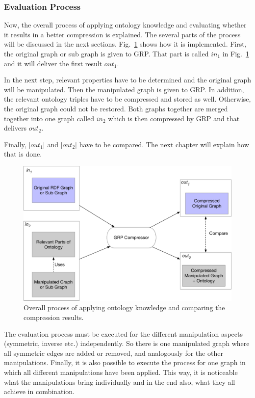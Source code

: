 \subsubsection{Evaluation Process}
Now, the overall process of applying ontology knowledge and evaluating whether it results in a better compression is explained. The several parts of the process will be discussed in the next sections. Fig.~\ref{fig:overallprocess} shows how it is implemented. First, the original graph or sub graph is given to GRP. That part is called $in_1$ in Fig.~\ref{fig:overallprocess} and it will deliver the first result $out_1$.

In the next step, relevant properties have to be determined and the original graph will be manipulated. Then the manipulated graph is given to GRP. In addition, the relevant ontology triples have to be compressed and stored as well. Otherwise, the original graph could not be restored. Both graphs together are merged together into one graph called $in_2$ which is then compressed by GRP and that delivers $out_2$. 

Finally, $|out_1|$ and $|out_2|$ have to be compared. The next chapter will explain how that is done.

\begin{figure}
	\centering
	\includegraphics[width=0.9\linewidth]{figures/4_implementation/overallProcess}
	\caption{Overall process of applying ontology knowledge and comparing the compression results.}
	\label{fig:overallprocess}
\end{figure}

The evaluation process must be executed for the different manipulation aspects (symmetric, inverse etc.) independently. So there is one manipulated graph where all symmetric edges are added or removed, and analogously for the other manipulations. Finally, it is also possible to execute the process for one graph in which all different manipulations have been applied. This way, it is noticeable what the manipulations bring individually and in the end also, what they all achieve in combination.

